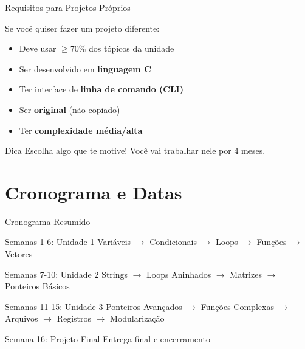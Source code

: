 \documentclass[10pt]{beamer}
\begin{document}
\begin{frame}{Requisitos para Projetos Próprios}
	\begin{alertblock}{Se você quiser fazer um projeto diferente:}
		\begin{itemize}
			\item Deve usar $\geq$70\% dos tópicos da unidade
			\item Ser desenvolvido em \textbf{linguagem C}
			\item Ter interface de \textbf{linha de comando (CLI)}
			\item Ser \textbf{original} (não copiado)
			\item Ter \textbf{complexidade média/alta}
		\end{itemize}
	\end{alertblock}
	
	\begin{block}{Dica}
		Escolha algo que te motive! Você vai trabalhar nele por 4 meses.
	\end{block}
\end{frame}

\section{Cronograma e Datas}

\begin{frame}{Cronograma Resumido}
	\begin{block}{Semanas 1-6: Unidade 1}
		Variáveis $\rightarrow$ Condicionais $\rightarrow$ Loops $\rightarrow$ Funções $\rightarrow$ Vetores
	\end{block}
	
	\begin{block}{Semanas 7-10: Unidade 2}  
		Strings $\rightarrow$ Loops Aninhados $\rightarrow$ Matrizes $\rightarrow$ Ponteiros Básicos
	\end{block}
	
	\begin{block}{Semanas 11-15: Unidade 3}
		Ponteiros Avançados $\rightarrow$ Funções Complexas $\rightarrow$ Arquivos $\rightarrow$ Registros $\rightarrow$ Modularização
	\end{block}
	
	\begin{exampleblock}{Semana 16: Projeto Final}
		Entrega final e encerramento
	\end{exampleblock}
\end{frame}
\end{document}
